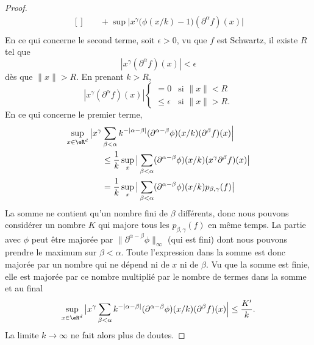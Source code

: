 \begin{proof}
\begin{equation}
\begin{aligned}[]
			                                                        & \quad+\sup \big| x^{\gamma}\big( \phi(x/k)-1 \big)(\partial^{\alpha}f)(x) \big|                                                     \\
		\end{aligned}
	\end{equation}
	En ce qui concerne le second terme, soit \( \epsilon>0\), vu que \( f\) est Schwartz, il existe \( R\) tel que
	\begin{equation}
		| x^{\gamma}(\partial^{\alpha}f)(x) |<\epsilon
	\end{equation}
	dès que \( \| x \|>R\). En prenant \( k>R\),
	\begin{equation}
		| x^{\gamma}(\partial^{\alpha}f)(x) |\begin{cases}
			=0            & \text{si } \| x \|<R         \\
			\leq \epsilon & \text{si } \| x \|>R\text{.}
		\end{cases}
	\end{equation}
	En ce qui concerne le premier terme,
	\begin{subequations}
		\begin{align}
			\sup_{x\in \eR^d}\big| x^{\gamma} & \sum_{\beta<\alpha}k^{-|\alpha-\beta |}(\partial^{\alpha-\beta}\phi)(x/k)(\partial^{\beta}f)(x) \Big|                       \\
			                                  & \leq \frac{1}{ k }\sup_{x}\big| \sum_{\beta<\alpha}(\partial^{\alpha-\beta}\phi)(x/k)(x^{\gamma}\partial^{\beta}f)(x) \big| \\
			                                  & = \frac{1}{ k }\sup_{x}\big| \sum_{\beta<\alpha}(\partial^{\alpha-\beta}\phi)(x/k)  p_{\beta,\gamma}(f)   \big|
		\end{align}
	\end{subequations}
	La somme ne contient qu'un nombre fini de \( \beta\) différents, donc nous pouvons considérer un nombre \( K\) qui majore tous les \( p_{\beta,\gamma}(f)\) en même temps. La partie avec \( \phi\) peut être majorée par \( \| \partial^{\alpha-\beta}\phi \|_{\infty}\) (qui est fini) dont nous pouvons prendre le maximum sur \(\beta<\alpha\). Toute l'expression dans la somme est donc majorée par un nombre qui ne dépend ni de \( x\) ni de \( \beta\). Vu que la somme est finie, elle est majorée par ce nombre multiplié par le nombre de termes dans la somme et au final
	\begin{equation}
		\sup_{x\in \eR^d}\big| x^{\gamma}\sum_{\beta<\alpha}k^{-|\alpha-\beta |}(\partial^{\alpha-\beta}\phi)(x/k)(\partial^{\beta}f)(x) \Big|\leq \frac{ K' }{ k }.
	\end{equation}
	La limite \( k\to \infty\) ne fait alors plus de doutes.
\end{proof}

